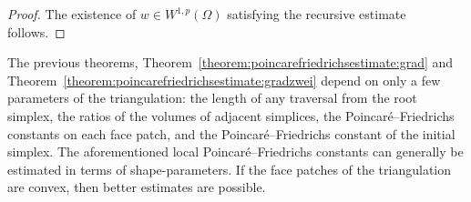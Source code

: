 \documentclass[10pt,letterpaper]{article}
\begin{document}
\begin{proof}
    The existence of $w \in W^{1,p}(\Omega)$ satisfying the recursive estimate follows. 
\end{proof}

\begin{remark}
    The previous theorems, Theorem~\ref{theorem:poincarefriedrichsestimate:grad} and Theorem~\ref{theorem:poincarefriedrichsestimate:gradzwei} 
    depend on only a few parameters of the triangulation:
    the length of any traversal from the root simplex, the ratios of the volumes of adjacent simplices,
    the Poincar\'e--Friedrichs constants on each face patch, and the Poincar\'e--Friedrichs constant of the initial simplex. 
    The aforementioned local Poincar\'e--Friedrichs constants can generally be estimated in terms of shape-parameters. 
    If the face patches of the triangulation are convex, then better estimates are possible. 
\end{remark}
\end{document}
